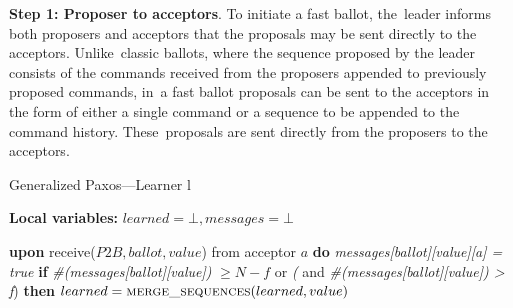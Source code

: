 \documentclass[algorithms,article,accept,moreauthors,pdftex,10pt,a4paper]{Definitions/mdpi}
\begin{document}
{\bf Step 1: Proposer to acceptors}. 
To initiate a fast ballot, the~leader informs both proposers and acceptors that the proposals may be sent directly to the acceptors. Unlike~classic ballots, where the sequence proposed by the leader consists of the commands received from the proposers appended to previously proposed commands, in~a fast ballot proposals can be sent to the acceptors in the form of either a single command or a sequence to be appended to the command history. These~proposals are sent directly from the proposers to the acceptors.\par

\begin{algorithm}[H]
\caption{Generalized Paxos---Learner l}
\label{CFT-Learn}
\textbf{Local variables: } $learned = \bot, messages = \bot$ 
\begin{algorithmic}[1]
\State \textbf{upon} receive($P2B, ballot, value$) from acceptor $a$ \textbf{do}
\State \hspace{\algorithmicindent} \emph{messages[ballot][value][a] = true}
\State \hspace{\algorithmicindent} \textbf{if} \emph{\#(messages[ballot][value])} $\geq N-f$ or \emph{(} and \emph{\#(messages[ballot][value]) > f}) \textbf{then}
\State \hspace{\algorithmicindent} \hspace{\algorithmicindent} $learned = \Call{merge\_sequences}{learned, value}$
\end{algorithmic}
\end{algorithm}
\end{document}
